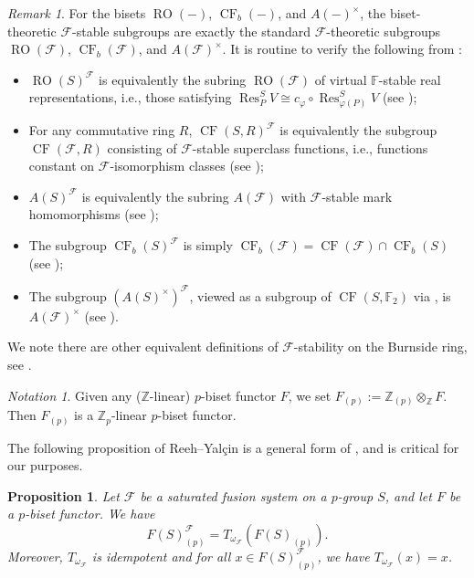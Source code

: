 \documentclass[]{amsart}
\newcommand{\Res}{\operatorname{Res}}
\newcommand{\on}[1]{\operatorname{#1}}
\newcommand{\calF}{\mathcal{F}}
\newcommand{\bbF}{\mathbb{F}}
\newcommand{\bbZ}{\mathbb{Z}}
\newcommand{\RO}{\on{RO}}
\newcommand{\CF}{\on{CF}}
\newtheorem{proposition}[theorem]{Proposition}
\theoremstyle{remark}
\newtheorem{remark}[theorem]{Remark}
\newtheorem{notation}[theorem]{Notation}
\theoremstyle{definition}
\begin{document}
	\begin{remark}\label{def:stable_biset}
		For the bisets $\RO(-)$, $\CF_b(-)$, and $A(-)^\times$, the biset-theoretic $\calF$-stable subgroups are exactly the standard $\calF$-theoretic subgroups $\RO(\calF)$, $\CF_b(\calF)$, and $A(\calF)^\times$. 
		It is routine to verify the following from :
		\begin{itemize}
			\item $\on{RO}(S)^\calF$ is equivalently the subring $\RO(\calF)$ of virtual $\bbF$-stable real representations, i.e., those satisfying $\Res^S_P V \cong c_{\varphi}\circ\Res^S_{\varphi(P)}{} V$ (see \cite[Section 3]{RY18});
			\item For any commutative ring $R$, $\CF(S,R)^\calF$ is equivalently the subgroup $\CF(\calF,R) $ consisting of $\calF$-stable superclass functions, i.e., functions constant on $\calF$-isomorphism classes (see \cite[Section 4]{RY18});
			\item $A(S)^\calF$ is equivalently the subring $A(\calF)$ with $\calF$-stable mark homomorphisms (see \cite{DL09});
			\item The subgroup $\CF_b(S)^\calF$ is simply $\CF_b(\calF) =\CF(\calF) \cap \CF_b(S)$ (see \cite[Section 4]{RY18});
			\item The subgroup $(A(S)^\times)^\calF$, viewed as a subgroup of $\CF(S,\bbF_2)$ via , is $A(\calF)^\times$ (see \cite{BC20}).
		\end{itemize}
		We note there are other equivalent definitions of $\calF$-stability on the Burnside ring, see \cite[Subsection 3.1]{Ree16}.
	\end{remark}
	
	\begin{notation}
		Given any ($\bbZ$-linear) $p$-biset functor $F$, we set $F_{(p)} := \bbZ_{(p)}\otimes_\bbZ F$. Then $F_{(p)}$ is a $\bbZ_p$-linear $p$-biset functor. 
	\end{notation}
	
	The following proposition of Reeh--Yal\c{c}in is a general form of \cite[Theorem A]{Ree16}, and is critical for our purposes.
	
	\begin{proposition}\cite[Proposition 2.5]{RY18}\label{prop:make_fusion_stable}
		Let $\calF$ be a saturated fusion system on a $p$-group $S$, and let $F$ be a $p$-biset functor. We have \[F(S)^\calF_{(p)} = T_{\omega_\calF}(F(S)_{(p)}).\] Moreover, $T_{\omega_\calF}$ is idempotent and for all $x \in F(S)^\calF_{(p)}$, we have $T_{\omega_\calF}(x) = x$. 
	\end{proposition}
	
\end{document}
